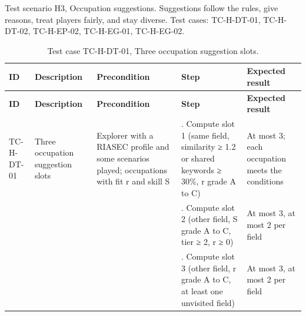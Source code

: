 Test scenario H3, Occupation suggestions. Suggestions follow the rules, give reasons, treat players fairly, and stay diverse. Test cases: TC-H-DT-01, TC-H-DT-02, TC-H-EP-02, TC-H-EG-01, TC-H-EG-02.

{\small
\begin{longtable}{|>{\raggedright\arraybackslash}p{}|>{\raggedright\arraybackslash}p{}|>{\raggedright\arraybackslash}p{}|>{\raggedright\arraybackslash}p{}|>{\raggedright\arraybackslash}p{}|}
\caption{Test case TC-H-DT-01, Three occupation suggestion slots.} \\
\hline
\textbf{ID} & \textbf{Description} & \textbf{Precondition} & \textbf{Step} & \textbf{Expected result} \\ \hline
\endfirsthead
\hline
\textbf{ID} & \textbf{Description} & \textbf{Precondition} & \textbf{Step} & \textbf{Expected result} \\ \hline
\endhead
TC-H-DT-01 & Three occupation suggestion slots & Explorer with a RIASEC profile and some scenarios played; occupations with fit r and skill S & 1. Compute slot 1 (same field, similarity ≥ 1.2 or shared keywords ≥ 30\%, r grade A to C) & At most 3; each occupation meets the conditions \\ \hline
 &  &  & 2. Compute slot 2 (other field, S grade A to C, tier ≥ 2, r ≥ 0) & At most 3, at most 2 per field \\ \hline
 &  &  & 3. Compute slot 3 (other field, r grade A to C, at least one unvisited field) & At most 3, at most 2 per field \\ \hline
\end{longtable}
}

